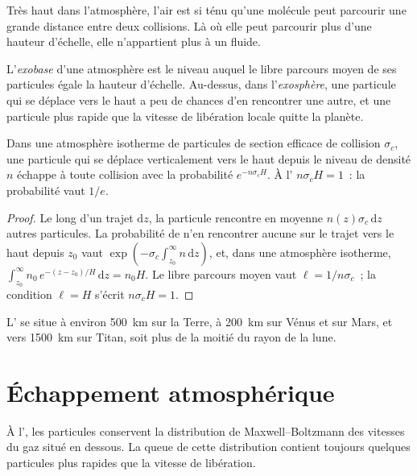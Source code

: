Très haut dans l'atmosphère, l'air est si ténu qu'une molécule peut parcourir une grande distance
entre deux collisions. Là où elle peut parcourir plus d'une hauteur d'échelle, elle n'appartient
plus à un fluide.

\begin{definition}\label{def:b3:planetary-atmospheres:exobase}
L'\emph{exobase} d'une atmosphère est le niveau auquel le libre parcours moyen
de ses particules égale la hauteur d'échelle. Au-dessus,
dans l'\emph{exosphère}, une particule qui se déplace vers le haut
a peu de chances d'en rencontrer une autre, et une particule plus rapide que la vitesse
de libération locale quitte la planète.
\end{definition}

\begin{proposition}\label{prop:b3:planetary-atmospheres:exobase}
Dans une atmosphère isotherme de particules de section efficace de collision
$\sigma_c$, une particule qui se déplace verticalement vers le haut depuis le niveau de densité
$n$ échappe à toute collision avec la probabilité $e^{-n\sigma_c H}$. À
l' $n\sigma_c H = 1$~: la probabilité vaut $1/e$.
\end{proposition}

\begin{proof}
Le long d'un trajet $\mathrm dz$, la particule rencontre en moyenne $n(z)\sigma_c\,
\mathrm dz$ autres particules. La probabilité de n'en rencontrer aucune sur le trajet vers le haut depuis
$z_0$ vaut $\exp(-\sigma_c\int_{z_0}^\infty n\,\mathrm dz)$, et, dans une atmosphère
isotherme, $\int_{z_0}^\infty n_0\,e^{-(z-z_0)/H}\,\mathrm dz
= n_0 H$. Le libre parcours moyen vaut $\ell = 1/n\sigma_c$~; la condition $\ell
= H$ s'écrit $n\sigma_c H = 1$.
\end{proof}

L' se situe à environ \qty{500}{km} sur la Terre, à \qty{200}{km}
sur Vénus et sur Mars, et vers \qty{1500}{km} sur Titan, soit plus de la moitié du
rayon de la lune.

\section{Échappement atmosphérique}\label{sec:b3:planetary-atmospheres:escape}

À l', les particules conservent la distribution de Maxwell--Boltzmann
des vitesses du gaz situé en dessous. La queue de cette distribution contient toujours quelques particules plus rapides
que la vitesse de libération.


